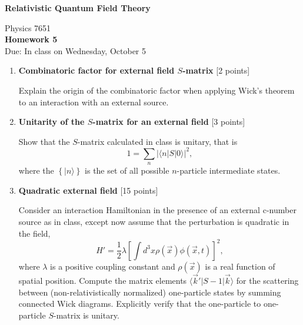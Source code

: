 \documentclass[12pt]{article}
\begin{document}
\vspace*{-1cm}
\begin{center}
{\LARGE \bf Relativistic Quantum Field Theory}

\vspace*{0.5cm}
{\Large Physics 7651} \\
\vspace*{0.5cm}
{\Large {\bf Homework 5}\\
\vspace*{0.5cm}
Due: In class on Wednesday, October 5}
\end{center}
\begin{enumerate}


\item  {\bf Combinatoric factor for external field $S$-matrix} [2 points]

Explain the origin of the combinatoric factor when applying Wick's theorem to an interaction with an external source. 

\item {\bf Unitarity of the $S$-matrix for an external field} [3 points]

Show that the $S$-matrix calculated in class is unitary, that is 
\[ 1 = \sum_n |\langle n|S|0\rangle |^2, \]
where the $\left\{|n\rangle\right\} $ is the set of all possible $n$-particle intermediate states.

\item{\bf Quadratic external field} [15 points]

Consider an interaction Hamiltonian in the presence of an external c-number source as in class, except now assume that the perturbation is quadratic in the field,
$$ H'= \frac{1}{2} \lambda \left[ \int d^3x \rho (\vec{x}) \phi (\vec{x},t)\right]^2,$$
where $\lambda$ is a positive coupling constant and $\rho (\vec{x})$ is a real function of spatial position. Compute the matrix elements $\langle \vec{k}'|S-1|\vec{k}\rangle$ for the scattering between (non-relativistically normalized) one-particle states by summing  connected Wick diagrams. Explicitly verify that the one-particle to one-particle $S$-matrix is unitary. 


\end{enumerate}
\end{document}

